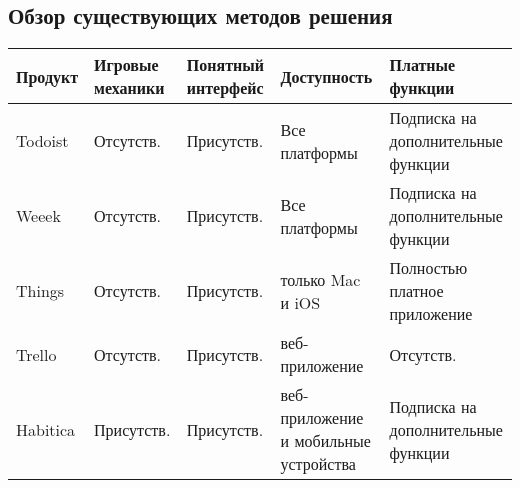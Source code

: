 \documentclass[../document.tex]{subfiles}
\begin{document}
\subsection{Обзор существующих методов решения}
\begin{tabular}{ | m{5em} | m{5em} | m{5em} | m{5em} | m{5em} | }
    \hline
    Продукт  & Игровые механики & Понятный интерфейс & Доступность                           & Платные функции                    \\
    \hline
    Todoist  & Отсутств.        & Присутств.         & Все платформы                         & Подписка на дополнительные функции \\
    \hline
    Weeek    & Отсутств.        & Присутств.         & Все платформы                         & Подписка на дополнительные функции \\
    \hline
    Things   & Отсутств.        & Присутств.         & только Mac и iOS                      & Полностью платное приложение       \\
    \hline
    Trello   & Отсутств.        & Присутств.         & веб-приложение                        & Отсутств.                          \\
    \hline
    Habitica & Присутств.       & Присутств.         & веб-приложение и мобильные устройства & Подписка на дополнительные функции \\
    \hline
\end{tabular}
\end{document}

